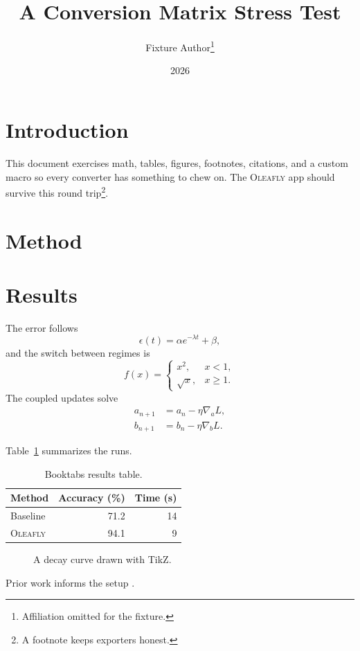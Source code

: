 \documentclass[10pt]{article}
\title{A Conversion Matrix Stress Test}
\author{Fixture Author\footnote{Affiliation omitted for the fixture.}}
\date{2026}
\newcommand{\system}{\textsc{Oleafly}}
\begin{document}
\maketitle

\section{Introduction}
This document exercises math, tables, figures, footnotes, citations, and a
custom macro so every converter has something to chew on.
The \system{} app should survive this round trip\footnote{A footnote keeps
exporters honest.}.

\section{Method}


\section{Results}
The error follows
\begin{equation}
  \label{eq:err}
  \epsilon(t) = \alpha e^{-\lambda t} + \beta,
\end{equation}
and the switch between regimes is
\begin{equation}
  f(x) =
  \begin{cases}
    x^2, & x < 1, \\
    \sqrt{x}, & x \geq 1.
  \end{cases}
\end{equation}
The coupled updates solve
\begin{align}
  a_{n+1} &= a_n - \eta \nabla_a L, \\
  b_{n+1} &= b_n - \eta \nabla_b L.
\end{align}

Table~\ref{tab:results} summarizes the runs.
\begin{table}[htbp]
  \centering
  \caption{Booktabs results table.}
  \label{tab:results}
  \begin{tabular}{lrr}
    \toprule
    Method & Accuracy (\%) & Time (s) \\
    \midrule
    Baseline & 71.2 & 14 \\
    \system{} & 94.1 & 9 \\
    \bottomrule
  \end{tabular}
\end{table}

\begin{figure}[htbp]
  \centering
  \caption{A decay curve drawn with TikZ.}
  \label{fig:decay}
\end{figure}

Prior work informs the setup \cite{knuth1984literate, lamport1994latex}.



\end{document}
